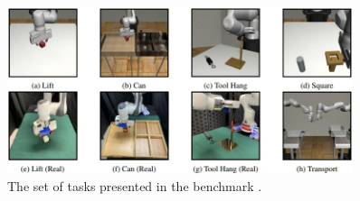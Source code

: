 \begin{figure}[t]
    \centering
    \includegraphics[width=0.9\textwidth]{figures/images/what_matters/task.jpg}
    \caption{The set of tasks presented in the benchmark \cite{mandlekar2022matters}.}
    \label{fig:what_matters_task}
\end{figure}